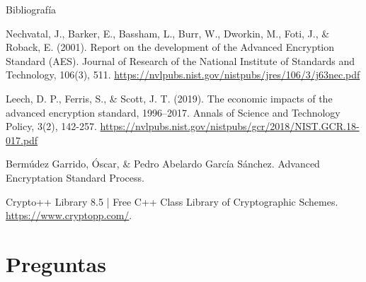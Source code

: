\documentclass{beamer}
\begin{document}
\begin{frame}[allowframebreaks]{Bibliografía}
\begin{thebibliography}{9}

	Nechvatal, J., Barker, E., Bassham, L., Burr, W., Dworkin, M., Foti, J., \& Roback, E. (2001). Report on the development of the Advanced Encryption Standard (AES). Journal of Research of the National Institute of Standards and Technology, 106(3), 511. \url{https://nvlpubs.nist.gov/nistpubs/jres/106/3/j63nec.pdf}


	Leech, D. P., Ferris, S., \& Scott, J. T. (2019). The economic impacts of the advanced encryption standard, 1996–2017. Annals of Science and Technology Policy, 3(2), 142-257. \url{https://nvlpubs.nist.gov/nistpubs/gcr/2018/NIST.GCR.18-017.pdf}



	Bermúdez Garrido, Óscar, \& Pedro Abelardo García Sánchez. Advanced Encryptation Standard Process.



	Crypto++ Library 8.5 | Free C++ Class Library of Cryptographic Schemes. \url{https://www.cryptopp.com/}.


\end{thebibliography}


\end{frame}

\section{Preguntas}
\end{document}
